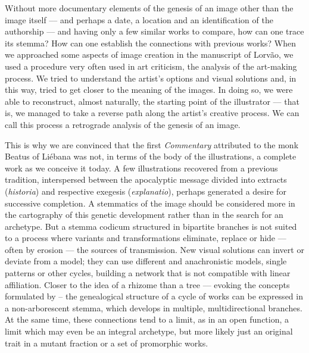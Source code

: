 \begin{paper}
Without more documentary elements of the genesis of an image other than
the image itself –– and perhaps a date, a location and an
identification of the authorship –– and having only a few similar works
to compare, how can one trace its stemma? How can one establish
the connections with previous works? When we approached some aspects of
image creation in the manuscript of Lorvão, we used a procedure very
often used in art criticism, the analysis of the art-making process. We
tried to understand the artist's options and visual solutions and, in
this way, tried to get closer to the meaning of the images. In doing so,
we were able to reconstruct, almost naturally, the starting point of the
illustrator –– that is, we managed to take a reverse path along the
artist's creative process. We can call this process a retrograde
analysis of the genesis of an image.

This is why we are convinced that the first \emph{Commentary} attributed
to the monk Beatus of Liébana was not, in terms of the body of the
illustrations, a complete work as we conceive it today. A few
illustrations recovered from a previous tradition, interspersed between
the apocalyptic message divided into extracts (\emph{historia}) and
respective exegesis (\emph{explanatio}), perhaps generated a desire for
successive completion. A stemmatics of the image should be considered
more in the cartography of this genetic development rather than in the
search for an archetype. But a stemma codicum structured in
bipartite branches is not suited to a process where variants and
transformations eliminate, replace or hide –– often by erosion –– the
sources of transmission. New visual solutions can invert or deviate from
a model; they can use different and anachronistic models, single
patterns or other cycles, building a network that is not compatible with
linear affiliation. Closer to the idea of a rhizome than a tree –– 
evoking the concepts formulated by \citet{deleuze_rhizome_1976} --
the genealogical structure of a cycle of works can be expressed in a
non-arborescent stemma, which develops in multiple,
multidirectional branches. At the same time, these connections tend to a
limit, as in an open function, a limit which may even be an integral
archetype, but more likely just an original trait in a mutant fraction
or a set of promorphic works.


\end{paper}
